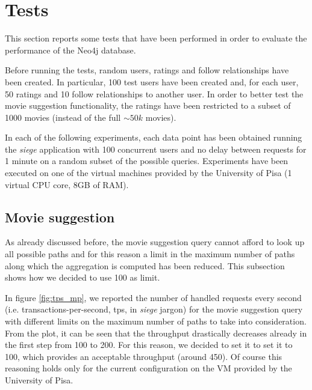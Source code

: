\documentclass[11pt]{article}
\begin{document}
\section{Tests}
This section reports some tests that have been performed in order to evaluate 
the performance of the Neo4j database.

Before running the tests, random users, ratings and follow relationships have 
been created. In particular, 100 test users have been created and, for each 
user, 50 ratings and 10 follow relationships to another user. In order to 
better test the movie suggestion functionality, the ratings have been restricted
to a subset of 1000 movies (instead of the full $\sim50k$ movies).

In each of the following experiments, each data point has been obtained running 
the \emph{siege} application with 100 concurrent users and no delay between 
requests for 1 minute on a random subset of the possible queries. Experiments 
have been executed on one of the virtual machines provided by the University 
of Pisa (1 virtual CPU core, 8GB of RAM).

\subsection{Movie suggestion}
As already discussed before, the movie suggestion query cannot afford to look
up all possible paths and for this reason a limit in the maximum number of paths
along which the aggregation is computed has been reduced. This subsection 
shows how we decided to use 100 as limit.

In figure \ref{fig:tps_mp}, we reported the number of handled requests every 
second (i.e. transactions-per-second, tps, in \emph{siege} jargon) for the 
movie suggestion query with different limits on the maximum number of paths to 
take into consideration. From the plot, it can be seen that the throughput 
drastically decreases already in the first step from 100 to 200. For this 
reason, we decided to set it to set it to 100, which provides an acceptable 
throughput (around 450). Of course this reasoning holds only for the current 
configuration on the VM provided by the University of Pisa.
\end{document}
